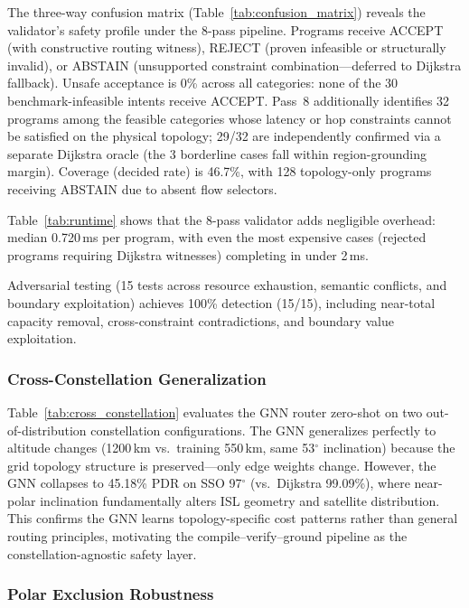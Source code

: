 \documentclass[10pt, conference, letterpaper]{IEEEtran}
\newcommand{\decision}[1]{\textsf{\MakeUppercase{#1}}}
\begin{document}
The three-way confusion matrix (Table~\ref{tab:confusion_matrix})
reveals the validator's safety profile under the 8-pass pipeline.
Programs receive \decision{Accept} (with constructive routing witness),
\decision{Reject} (proven infeasible or structurally invalid), or
\decision{Abstain} (unsupported constraint combination---deferred to Dijkstra fallback).
Unsafe acceptance is 0\% across all categories: none of the 30
benchmark-infeasible intents receive \decision{Accept}. Pass~8
additionally identifies 32 programs among the feasible categories
whose latency or hop constraints cannot be satisfied on the physical
topology; 29/32 are independently confirmed via a separate Dijkstra
oracle (the 3 borderline cases fall within region-grounding margin).
Coverage (decided rate) is 46.7\%, with 128 topology-only programs
receiving \decision{Abstain} due to absent flow selectors.

Table~\ref{tab:runtime} shows that the 8-pass validator adds
negligible overhead: median 0.720\,ms per program, with even the
most expensive cases (rejected programs requiring Dijkstra witnesses)
completing in under 2\,ms.

Adversarial testing (15 tests across resource exhaustion, semantic
conflicts, and boundary exploitation) achieves 100\% detection
(15/15), including near-total capacity removal, cross-constraint
contradictions, and boundary value exploitation.

\subsubsection{Cross-Constellation Generalization}

Table~\ref{tab:cross_constellation} evaluates the GNN router
zero-shot on two out-of-distribution constellation configurations.
The GNN generalizes perfectly to altitude changes (1200\,km vs.\
training 550\,km, same 53$^\circ$ inclination) because the grid
topology structure is preserved---only edge weights change. However,
the GNN collapses to 45.18\% PDR on SSO 97$^\circ$ (vs.\ Dijkstra
99.09\%), where near-polar inclination fundamentally alters ISL
geometry and satellite distribution. This confirms the GNN learns
topology-specific cost patterns rather than general routing
principles, motivating the compile--verify--ground pipeline as the
constellation-agnostic safety layer.

\subsubsection{Polar Exclusion Robustness}
\end{document}
